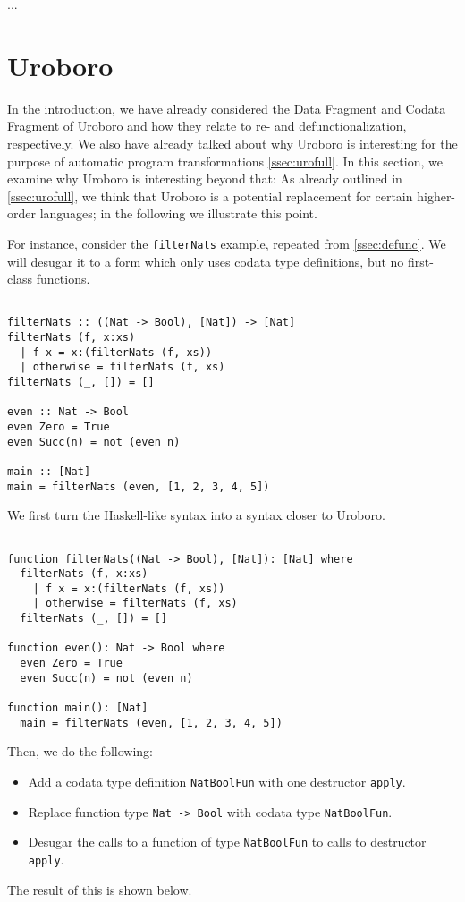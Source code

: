 ...

\section{Uroboro}
\label{sec:reluro}

In the introduction, we have already considered the Data Fragment and Codata Fragment of Uroboro and how they relate to re- and defunctionalization, respectively. We also have already talked about why Uroboro is interesting for the purpose of automatic program transformations \autoref{ssec:urofull}. In this section, we examine why Uroboro is interesting beyond that: As already outlined in \autoref{ssec:urofull}, we think that Uroboro is a potential replacement for certain higher-order languages; in the following we illustrate this point.

For instance, consider the \texttt{filterNats} example, repeated from \autoref{ssec:defunc}. We will desugar it to a form which only uses codata type definitions, but no first-class functions.

\begin{lstlisting}

filterNats :: ((Nat -> Bool), [Nat]) -> [Nat]
filterNats (f, x:xs)
  | f x = x:(filterNats (f, xs))
  | otherwise = filterNats (f, xs)
filterNats (_, []) = []

even :: Nat -> Bool
even Zero = True
even Succ(n) = not (even n)

main :: [Nat]
main = filterNats (even, [1, 2, 3, 4, 5])

\end{lstlisting}

We first turn the Haskell-like syntax into a syntax closer to Uroboro.

\begin{lstlisting}

function filterNats((Nat -> Bool), [Nat]): [Nat] where
  filterNats (f, x:xs)
    | f x = x:(filterNats (f, xs))
    | otherwise = filterNats (f, xs)
  filterNats (_, []) = []

function even(): Nat -> Bool where
  even Zero = True
  even Succ(n) = not (even n)

function main(): [Nat]
  main = filterNats (even, [1, 2, 3, 4, 5])

\end{lstlisting}

Then, we do the following:
\begin{itemize}
\item Add a codata type definition \texttt{NatBoolFun} with one destructor \texttt{apply}.

\item Replace function type \texttt{Nat -> Bool} with codata type \texttt{NatBoolFun}.

\item Desugar the calls to a function of type \texttt{NatBoolFun} to calls to destructor \texttt{apply}.
\end{itemize}
The result of this is shown below.

